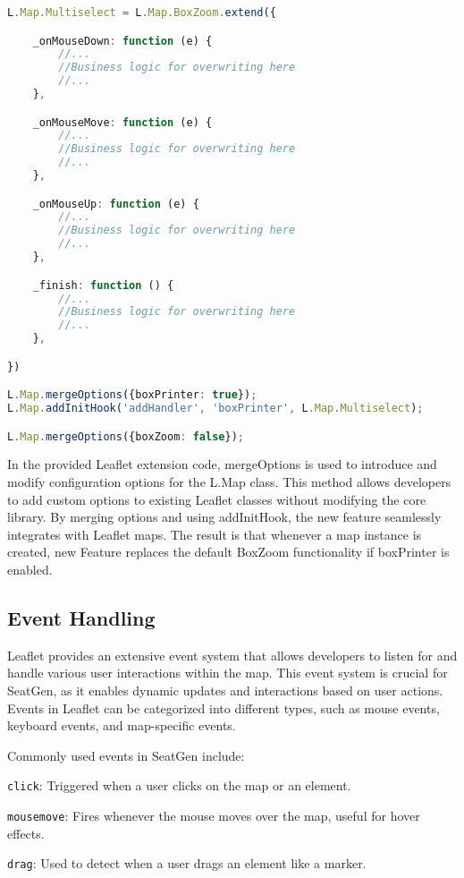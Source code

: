 \begin{lstlisting}[language=Typescript, caption={Modifying Leaflet Features},label={lst:leaflet-modification}]
L.Map.Multiselect = L.Map.BoxZoom.extend({

    _onMouseDown: function (e) {
        //...
        //Business logic for overwriting here
        //...
    },

    _onMouseMove: function (e) {
        //...
        //Business logic for overwriting here
        //...
    },

    _onMouseUp: function (e) {
        //...
        //Business logic for overwriting here
        //...
    },

    _finish: function () {
        //...
        //Business logic for overwriting here
        //...
    },

})

L.Map.mergeOptions({boxPrinter: true});
L.Map.addInitHook('addHandler', 'boxPrinter', L.Map.Multiselect);

L.Map.mergeOptions({boxZoom: false});

\end{lstlisting}


In the provided Leaflet extension code, mergeOptions is used to introduce and modify configuration options for the L.Map class. This method allows developers to add custom options to existing Leaflet classes without modifying the core library. By merging options and using addInitHook, the new feature seamlessly integrates with Leaflet maps. The result is that whenever a map instance is created, new Feature replaces the default BoxZoom functionality if boxPrinter is enabled.

\subsection{Event Handling}
Leaflet provides an extensive event system that allows developers to listen for and handle various user interactions within the map. This event system is crucial for SeatGen, as it enables dynamic updates and interactions based on user actions. Events in Leaflet can be categorized into different types, such as mouse events, keyboard events, and map-specific events.

Commonly used events in SeatGen include:
\begin{compactitem}
\item \texttt{click}: Triggered when a user clicks on the map or an element.
\item \texttt{mousemove}: Fires whenever the mouse moves over the map, useful for hover effects.
\item \texttt{drag}: Used to detect when a user drags an element like a marker.
\end{compactitem}

